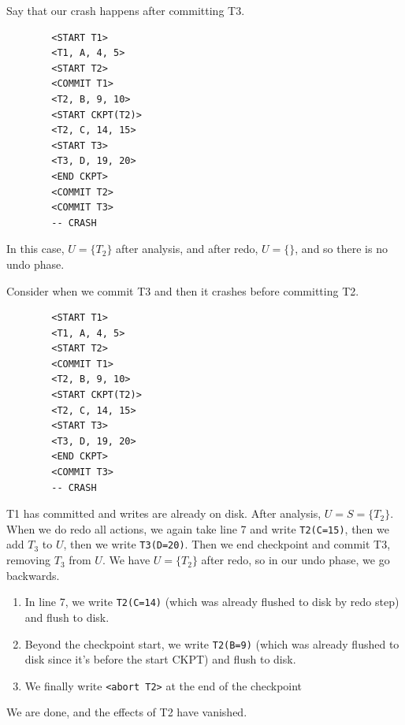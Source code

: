     \begin{example}
      \label{ex:crash-after-t2-and-t3}
      Say that our crash happens after committing T3. 

      \begin{lstlisting}
        <START T1>
        <T1, A, 4, 5>
        <START T2>
        <COMMIT T1>
        <T2, B, 9, 10>
        <START CKPT(T2)>
        <T2, C, 14, 15>
        <START T3>
        <T3, D, 19, 20>
        <END CKPT>
        <COMMIT T2>
        <COMMIT T3>
        -- CRASH
      \end{lstlisting} 
      In this case, $U = \{T_2\}$ after analysis, and after redo, $U = \{\}$, and so there is no undo phase. 
    \end{example}

    \begin{example}
      \label{ex:crash-after-t3}
      Consider when we commit T3 and then it crashes before committing T2. 
      \begin{lstlisting}
        <START T1>
        <T1, A, 4, 5>
        <START T2>
        <COMMIT T1>
        <T2, B, 9, 10>
        <START CKPT(T2)>
        <T2, C, 14, 15>
        <START T3>
        <T3, D, 19, 20>
        <END CKPT>
        <COMMIT T3>
        -- CRASH
      \end{lstlisting} 
      T1 has committed and writes are already on disk. After analysis, $U = S = \{T_2\}$. When we do redo all actions, we again take line 7 and write \texttt{T2(C=15)}, then we add $T_3$ to $U$, then we write \texttt{T3(D=20)}. Then we end checkpoint and commit T3, removing $T_3$ from $U$. We have $U = \{T_2\}$ after redo, so in our undo phase, we go backwards. 
      \begin{enumerate}
        \item In line 7, we write \texttt{T2(C=14)} (which was already flushed to disk by redo step) and flush to disk.  
        \item Beyond the checkpoint start, we write \texttt{T2(B=9)} (which was already flushed to disk since it's before the start CKPT) and flush to disk. 
        \item We finally write \texttt{<abort T2>} at the end of the checkpoint
      \end{enumerate} 
      We are done, and the effects of T2 have vanished. 
    \end{example}

